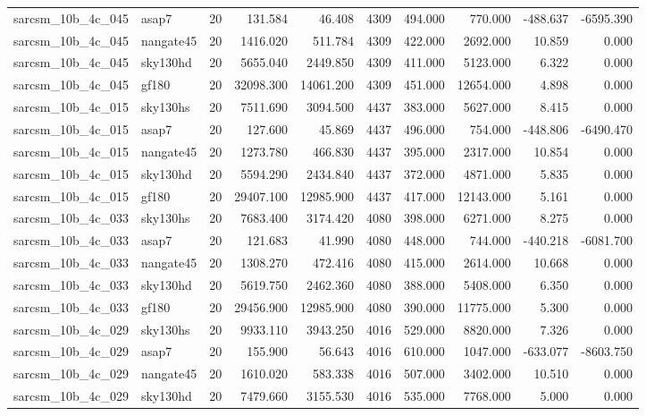 \documentclass{article}
\begin{document}
\begin{longtable}{llrrrrrrrr}
sarcsm\_10b\_4c\_045 & asap7 & 20 & 131.584 & 46.408 & 4309 & 494.000 & 770.000 & -488.637 & -6595.390 \\
sarcsm\_10b\_4c\_045 & nangate45 & 20 & 1416.020 & 511.784 & 4309 & 422.000 & 2692.000 & 10.859 & 0.000 \\
sarcsm\_10b\_4c\_045 & sky130hd & 20 & 5655.040 & 2449.850 & 4309 & 411.000 & 5123.000 & 6.322 & 0.000 \\
sarcsm\_10b\_4c\_045 & gf180 & 20 & 32098.300 & 14061.200 & 4309 & 451.000 & 12654.000 & 4.898 & 0.000 \\
sarcsm\_10b\_4c\_015 & sky130hs & 20 & 7511.690 & 3094.500 & 4437 & 383.000 & 5627.000 & 8.415 & 0.000 \\
sarcsm\_10b\_4c\_015 & asap7 & 20 & 127.600 & 45.869 & 4437 & 496.000 & 754.000 & -448.806 & -6490.470 \\
sarcsm\_10b\_4c\_015 & nangate45 & 20 & 1273.780 & 466.830 & 4437 & 395.000 & 2317.000 & 10.854 & 0.000 \\
sarcsm\_10b\_4c\_015 & sky130hd & 20 & 5594.290 & 2434.840 & 4437 & 372.000 & 4871.000 & 5.835 & 0.000 \\
sarcsm\_10b\_4c\_015 & gf180 & 20 & 29407.100 & 12985.900 & 4437 & 417.000 & 12143.000 & 5.161 & 0.000 \\
sarcsm\_10b\_4c\_033 & sky130hs & 20 & 7683.400 & 3174.420 & 4080 & 398.000 & 6271.000 & 8.275 & 0.000 \\
sarcsm\_10b\_4c\_033 & asap7 & 20 & 121.683 & 41.990 & 4080 & 448.000 & 744.000 & -440.218 & -6081.700 \\
sarcsm\_10b\_4c\_033 & nangate45 & 20 & 1308.270 & 472.416 & 4080 & 415.000 & 2614.000 & 10.668 & 0.000 \\
sarcsm\_10b\_4c\_033 & sky130hd & 20 & 5619.750 & 2462.360 & 4080 & 388.000 & 5408.000 & 6.350 & 0.000 \\
sarcsm\_10b\_4c\_033 & gf180 & 20 & 29456.900 & 12985.900 & 4080 & 390.000 & 11775.000 & 5.300 & 0.000 \\
sarcsm\_10b\_4c\_029 & sky130hs & 20 & 9933.110 & 3943.250 & 4016 & 529.000 & 8820.000 & 7.326 & 0.000 \\
sarcsm\_10b\_4c\_029 & asap7 & 20 & 155.900 & 56.643 & 4016 & 610.000 & 1047.000 & -633.077 & -8603.750 \\
sarcsm\_10b\_4c\_029 & nangate45 & 20 & 1610.020 & 583.338 & 4016 & 507.000 & 3402.000 & 10.510 & 0.000 \\
sarcsm\_10b\_4c\_029 & sky130hd & 20 & 7479.660 & 3155.530 & 4016 & 535.000 & 7768.000 & 5.000 & 0.000 \\

\end{longtable}
\end{document}
